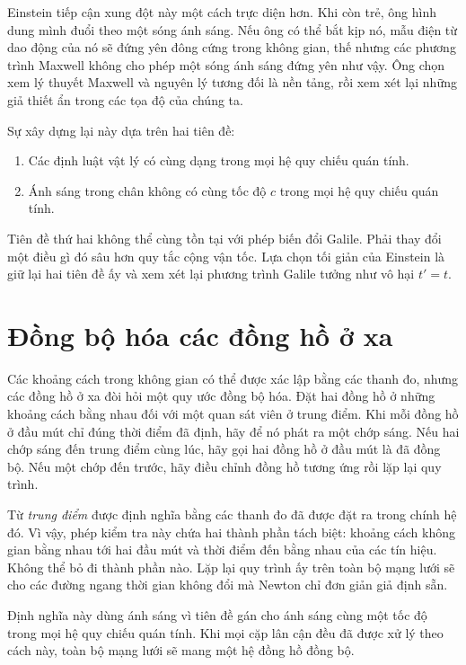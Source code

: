 Einstein tiếp cận xung đột này một cách trực diện hơn. Khi còn trẻ, ông hình dung mình đuổi theo một sóng ánh sáng. Nếu ông có thể bắt kịp nó, mẫu điện từ dao động của nó sẽ đứng yên đông cứng trong không gian, thế nhưng các phương trình Maxwell không cho phép một sóng ánh sáng đứng yên như vậy. Ông chọn xem lý thuyết Maxwell và nguyên lý tương đối là nền tảng, rồi xem xét lại những giả thiết ẩn trong các tọa độ của chúng ta.

Sự xây dựng lại này dựa trên hai tiên đề:
\begin{enumerate}
\item Các định luật vật lý có cùng dạng trong mọi hệ quy chiếu quán tính.
\item Ánh sáng trong chân không có cùng tốc độ \(c\) trong mọi hệ quy chiếu quán tính.
\end{enumerate}

Tiên đề thứ hai không thể cùng tồn tại với phép biến đổi Galile. Phải thay đổi một điều gì đó sâu hơn quy tắc cộng vận tốc. Lựa chọn tối giản của Einstein là giữ lại hai tiên đề ấy và xem xét lại phương trình Galile tưởng như vô hại \(t'=t\).

\section{Đồng bộ hóa các đồng hồ ở xa}

Các khoảng cách trong không gian có thể được xác lập bằng các thanh đo, nhưng các đồng hồ ở xa đòi hỏi một quy ước đồng bộ hóa. Đặt hai đồng hồ ở những khoảng cách bằng nhau đối với một quan sát viên ở trung điểm. Khi mỗi đồng hồ ở đầu mút chỉ đúng thời điểm đã định, hãy để nó phát ra một chớp sáng. Nếu hai chớp sáng đến trung điểm cùng lúc, hãy gọi hai đồng hồ ở đầu mút là đã đồng bộ. Nếu một chớp đến trước, hãy điều chỉnh đồng hồ tương ứng rồi lặp lại quy trình.

Từ \emph{trung điểm} được định nghĩa bằng các thanh đo đã được đặt ra trong chính hệ đó. Vì vậy, phép kiểm tra này chứa hai thành phần tách biệt: khoảng cách không gian bằng nhau tới hai đầu mút và thời điểm đến bằng nhau của các tín hiệu. Không thể bỏ đi thành phần nào. Lặp lại quy trình ấy trên toàn bộ mạng lưới sẽ cho các đường ngang thời gian không đổi mà Newton chỉ đơn giản giả định sẵn.

Định nghĩa này dùng ánh sáng vì tiên đề gán cho ánh sáng cùng một tốc độ trong mọi hệ quy chiếu quán tính. Khi mọi cặp lân cận đều đã được xử lý theo cách này, toàn bộ mạng lưới sẽ mang một hệ đồng hồ đồng bộ.

